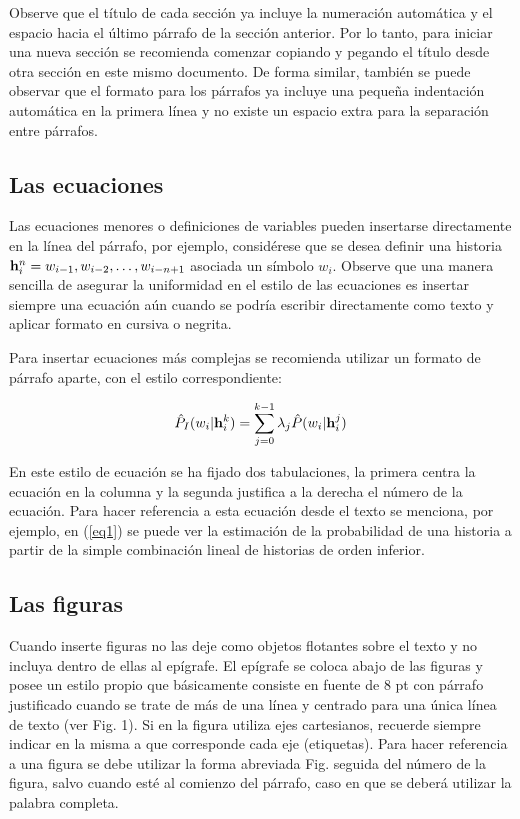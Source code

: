 \documentclass[conference,a4paper,10pt,oneside,final]{tfmpd}
\begin{document}
Observe que el título de cada sección ya incluye la numeración automática y el espacio hacia el último párrafo de la 
sección anterior. Por lo tanto, para iniciar una nueva sección se recomienda comenzar copiando y pegando el título desde otra sección en este mismo documento. De forma similar, también se puede observar que el formato para los párrafos ya incluye una pequeña indentación automática en la primera línea y no existe un espacio extra para la 
separación entre párrafos.

\subsection{Las ecuaciones}
Las ecuaciones menores o definiciones de variables pueden insertarse directamente en la línea del párrafo, por ejemplo, considérese que se desea definir una historia ${\rm {\bf h}}_i^n = w_{i - 1} ,w_{i - 2}, \ldots,w_{i - n + 1} $ asociada un símbolo $w_i $. Observe que una manera sencilla de asegurar la uniformidad en el estilo de las ecuaciones es insertar siempre una ecuación aún cuando se podría escribir directamente como texto y aplicar formato en cursiva o negrita.

Para insertar ecuaciones más complejas se recomienda utilizar un formato de párrafo aparte, con el estilo correspondiente:

\begin{equation}
\label{eq1}
\hat {P}_I (w_i \vert {\rm {\bf h}}_i^k ) = \sum\limits_{j=0}^{k-1} 
{\lambda _j \hat {P}(w_i \vert {\rm {\bf h}}_i^j )} 
\end{equation}

En este estilo de ecuación se ha fijado dos tabulaciones, la primera centra la ecuación en la columna y la segunda justifica a la derecha el número de la ecuación. Para hacer referencia a esta ecuación desde el texto se menciona, por ejemplo, en (\ref{eq1}) se puede ver la estimación de la probabilidad de una historia a partir de la simple combinación lineal de historias de orden inferior.

\subsection{Las figuras}

Cuando inserte figuras no las deje como objetos flotantes sobre el texto y no incluya dentro de ellas al epígrafe. El epígrafe se coloca abajo de las figuras y posee un estilo propio que básicamente consiste en fuente de 8 pt con párrafo justificado cuando se trate de más de una línea y centrado para una única línea de texto (ver Fig. 1). Si en la figura utiliza ejes cartesianos, recuerde siempre indicar en la misma a que corresponde cada eje (etiquetas). Para hacer referencia a una figura se debe utilizar la forma abreviada Fig. seguida del número de la figura, salvo cuando esté al comienzo del párrafo, caso en que se deberá utilizar la palabra completa.
\end{document}
